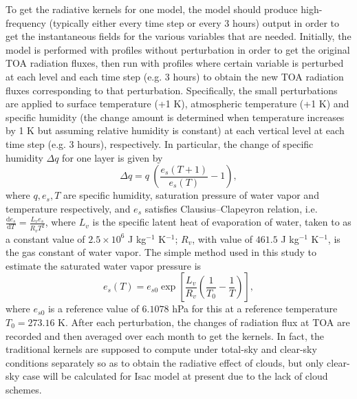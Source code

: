 To get the radiative kernels for one model, the model should produce high-frequency (typically either every time step or every 3 hours) output in order to get the instantaneous fields for the various variables that are needed. Initially, the model is performed with profiles without perturbation in order to get the original TOA radiation fluxes, then run with profiles where certain variable is perturbed at each level and each time step (e.g. 3 hours) to obtain the new TOA radiation fluxes corresponding to that perturbation. Specifically, the small perturbations are applied to surface temperature (+1 K), atmospheric temperature (+1 K) and specific humidity (the change amount is determined when temperature increases by 1 K but assuming relative humidity is constant) at each vertical level at each time step (e.g. 3 hours), respectively. In particular, the change of specific humidity $\Delta q$ for one layer is given by
\begin{equation}
\Delta q = q~\left(\frac{e_s(T+1)}{e_s(T)}-1\right),
\end{equation}
where $q, e_s, T$ are specific humidity, saturation pressure of water vapor and temperature respectively, and $e_s$ satisfies Clausius–Clapeyron relation, i.e. $\frac { \mathrm { d } e _ { s } } { \mathrm { d } T } = \frac { L _ { v } e _ { s } } { R _ { v } T ^ { 2 } }$,
where $L_v$ is the specific latent heat of evaporation of water, taken to as a constant value of $2.5\times 10^6$ J kg$^{-1}$ K$^{-1}$; $R_v$, with value of $461.5$ J kg$^{-1}$ K$^{-1}$, is the gas constant of water vapor. The simple method used in this study to estimate the saturated water vapor pressure is 
\begin{equation}
e_s(T) = e_{s0}\exp\left[\frac{L_v}{R_v}\left(\frac{1}{T_0}-\frac{1}{T} \right)\right],
\end{equation}
where $e_{s0}$ is a reference value of $6.1078$ hPa for this at a reference temperature $T_0=273.16$ K. After each perturbation, the changes of radiation flux at TOA are recorded and then averaged over each month to get the kernels. In fact, the traditional kernels are supposed to compute under total-sky and clear-sky conditions separately so as to obtain the radiative effect of clouds, but only clear-sky case will be calculated for Isac model at present due to the lack of cloud schemes.

